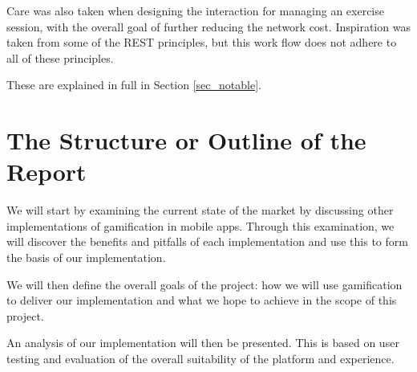 Care was also taken when designing the interaction for managing an
exercise session, with the overall goal of further reducing the
network cost. Inspiration was taken from some of the REST principles,
but this work flow does not adhere to all of these principles. 

These are explained in full in Section \ref{sec_notable}.

\section{The Structure or Outline of the Report}

We will start by examining the current state of the market by
discussing other implementations of gamification in mobile
apps. Through this examination, we will discover the benefits and
pitfalls of each implementation and use this to form the basis of our
implementation. 

We will then define the overall goals of the project: how we will use
gamification to deliver our implementation and what we hope to
achieve in the scope of this project. 

An analysis of our implementation will then be presented. This is
based on user testing and evaluation of the overall suitability of
the platform and experience.
